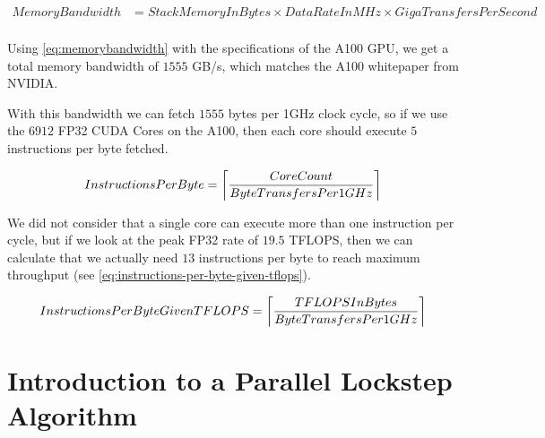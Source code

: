 \begin{equation}
\begin{split}
        MemoryBandwidth &= StackMemoryInBytes \times DataRateInMHz \times GigaTransfersPerSecond\label{eq:memorybandwidth}\\
\end{split}
\end{equation}

Using \autoref{eq:memorybandwidth} with the specifications of the A100 GPU, we get a total memory bandwidth of $1555$ GB/s, which matches the A100 whitepaper from NVIDIA\cite{nvidia-a100-architecture}.

With this bandwidth we can fetch $1555$ bytes per 1GHz clock cycle, so if we use the $6912$ FP32 CUDA Cores on the A100, then each core should execute $5$ instructions per byte fetched.

\begin{equation}
\begin{split}
        InstructionsPerByte &= \ceil*{\frac{CoreCount}{ByteTransfersPer1GHz}}\\
\end{split}
\end{equation}

We did not consider that a single core can execute more than one instruction per cycle, but if we look at the peak FP32 rate of $19.5$ TFLOPS, then we can calculate that we actually need $13$ instructions per byte to reach maximum throughput (see \autoref{eq:instructions-per-byte-given-tflops}).

\begin{equation}
\begin{split}
        InstructionsPerByteGivenTFLOPS &= \ceil*{\frac{TFLOPSInBytes}{ByteTransfersPer1GHz}}\label{eq:instructions-per-byte-given-tflops}\\
\end{split}
\end{equation}




\section{Introduction to a Parallel Lockstep Algorithm}

